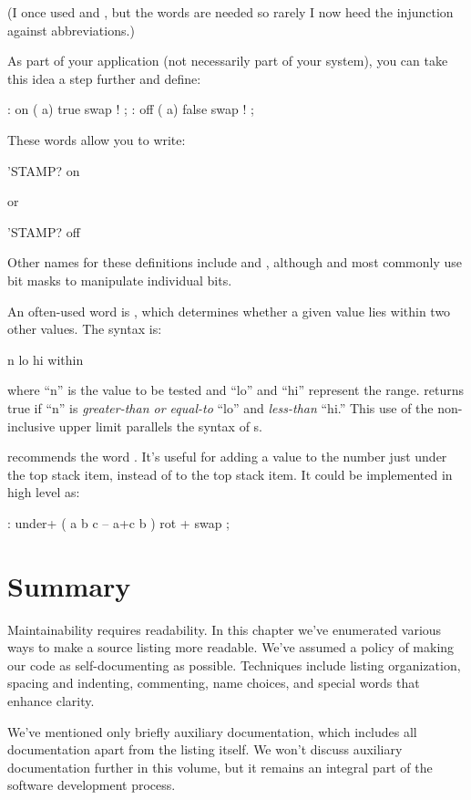 (I once used  and , but the words are
needed so rarely I now heed the injunction against abbreviations.)

As part of your application (not necessarily part of your \Forth{}
system), you can take this idea a step further and define:
\begin{Code}
: on   ( a)  true swap ! ;
: off   ( a)  false swap ! ;
\end{Code}
%
These words allow you to write:
\begin{Code}
'STAMP? on
\end{Code}
or
\begin{Code}
'STAMP? off
\end{Code}
Other names for these definitions include  and
, although  and  most commonly
use bit masks to manipulate individual bits.

An often-used word is , which determines
whether a given value lies within two other values.  The syntax is:
\begin{Code}
n  lo hi within
\end{Code}
where ``n'' is the value to be tested and ``lo'' and ``hi'' represent
the range.  returns true if ``n'' is
\emph{greater-than or equal-to} ``lo'' and \emph{less-than}
``hi.'' This use of the non-inclusive upper limit parallels the syntax
of s.

 recommends the word .
It's useful for adding a value to the number just under the top stack
item, instead of to the top stack item.  It could be implemented in
high level as:
\begin{Code}
: under+  ( a b c -- a+c b )  rot +  swap ;
\end{Code}

\section{Summary}
Maintainability requires readability.  In this chapter we've enumerated
various ways to make a source listing more readable.  We've assumed a
policy of making our code as self-documenting as possible.  Techniques
include listing organization, spacing and indenting, commenting, name
choices, and special words that enhance clarity.

We've mentioned only briefly auxiliary documentation, which includes
all documentation apart from the listing itself.  We won't discuss
auxiliary documentation further in this volume, but it remains an
integral part of the software development process.%

